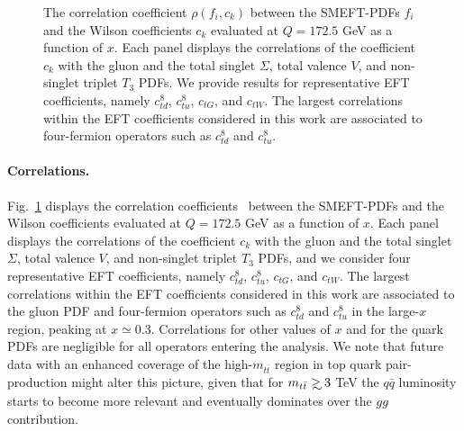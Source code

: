 \documentclass[withindex,glossary]{cam-thesis}
\def\gsim{\mathrel{\rlap{\lower4pt\hbox{\hskip1pt$\sim$}}
    \raise1pt\hbox{$>$}}}
\begin{document}
\begin{figure}[t!]
\caption{The correlation coefficient $\rho(f_i, c_k)$
  between the SMEFT-PDFs $f_i$ and the Wilson coefficients $c_k$ evaluated at $Q=172.5$ GeV
  as a function of $x$.
  Each panel displays the correlations of the coefficient $c_k$
  with the gluon and the total singlet $\Sigma$, total valence $V$, and non-singlet
  triplet $T_3$ PDFs.
  We provide results for representative EFT coefficients, namely $c_{td}^{8}$,
  $c_{tu}^{8}$, $c_{tG}$, and $c_{tW}$.
  The largest correlations within the EFT coefficients  considered in this
  work are associated to four-fermion operators such as  $c_{td}^{8}$ and $c_{tu}^{8}$.
}
\label{fig:smeft_pdf_corr}
\end{figure}

\paragraph{Correlations.} Fig.~\ref{fig:smeft_pdf_corr} displays the
correlation coefficients~\cite{Ball:2010de}
between the SMEFT-PDFs and the Wilson coefficients evaluated at $Q=172.5$ GeV
as a function of $x$.
%
Each panel displays the correlations of the coefficient $c_k$
with the gluon and the total singlet $\Sigma$, total valence $V$, and non-singlet
triplet $T_3$ PDFs, and we consider four representative EFT coefficients, namely $c_{td}^{8}$,
$c_{tu}^{8}$, $c_{tG}$, and $c_{tW}$.
%
The largest correlations within the EFT coefficients  considered in this
work are associated to the gluon PDF and four-fermion operators such as  $c_{td}^{8}$ and $c_{tu}^{8}$
in the large-$x$ region, peaking at $x\simeq 0.3$.
%
Correlations for other values of $x$ and for the quark PDFs are negligible
for all operators entering the analysis.
%
We note that future data with an enhanced coverage of the high-$m_{t\bar{t}}$ region in top quark
pair-production
might alter this picture, given that for $m_{t\bar{t}}\gsim 3$ TeV
the  $q\bar{q}$ luminosity starts to become more relevant and eventually dominates over the $gg$
contribution.
\end{document}
